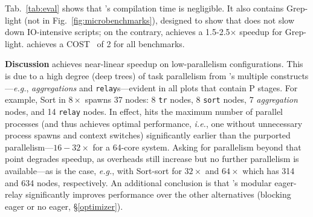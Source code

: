 \documentclass[letterpaper,twocolumn,10pt]{article}
\newcommand{\eg}{{\em e.g.}, }
\newcommand{\ie}{{\em i.e.}, }
\newcommand{\etc}{{\em etc.}\xspace}
\newcommand{\heading}[1]{\vspace{4pt}\noindent\textbf{#1}\enspace}
\newcommand{\ttt}[1]{\texttt{#1}}
\newcommand{\cn}[1]{\mbox{\textcircled{\footnotesize #1}}}
\newcommand{\pur}{\cn{\textsc{P}}\xspace}
\newcommand{\kk}[1]{[{\color{magenta}kk: #1}]}
\begin{document}
Tab.~\ref{tab:eval} shows that \sys's compilation time is negligible. %
It also contains Grep-light (not in Fig.~\ref{fig:microbenchmarks}), designed to show that \sys does not slow down IO-intensive scripts;
  on the contrary, \sys achieves a 1.5-2.5$\times$ speedup for Grep-light. 
\sys achieves a COST~\cite{mcsherryscalability} of 2 for all benchmarks.


\heading{Discussion}
\sys achieves near-linear speedup on low-parallelism configurations.
This is due to a high degree (deep trees) of task parallelism from \sys's multiple constructs---\eg \emph{aggregations} and \ttt{relay}s---evident in all plots that contain \pur stages.
For example, Sort in $8\times$ spawns 37 nodes:
  8 \ttt{tr} nodes, 8 \ttt{sort} nodes, 7 \emph{aggregation} nodes, and 14 \ttt{relay} nodes.
In effect, \sys hits the maximum number of parallel processes (and thus achieves optimal performance, \ie one without unnecessary process spawns and context switches) 
significantly earlier than the purported parallelism---$16-32\times$ for a 64-core system.
Asking for parallelism beyond that point degrades speedup, as overheads still increase but no further parallelism is available---as is the case, \eg  with Sort-sort for $32\times$ and $64\times$ which has 314 and 634 nodes, respectively.
% 
An additional conclusion is that \sys's modular eager-relay significantly improves performance over the other alternatives (blocking eager or no eager, \S\ref{optimizer}).
\end{document}
